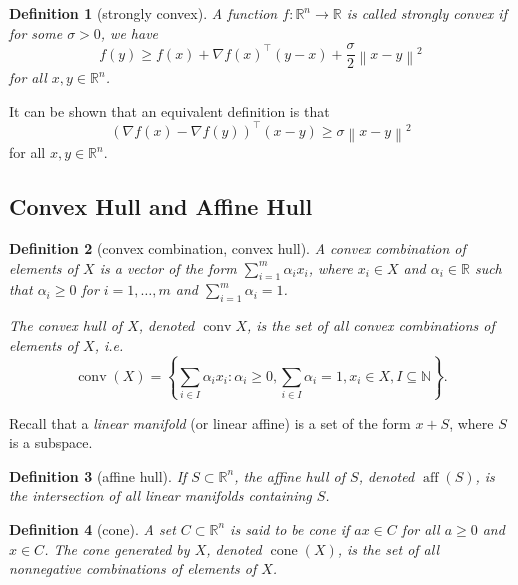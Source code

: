 \documentclass[12pt,a4paper]{article}
\numberwithin{equation}{section}
\theoremstyle{mystyle}
\newtheorem{definition}{Definition}[section]
\newcommand{\R}{\mathbb{R}}
\newcommand{\N}{\mathbb{N}}
\newcommand{\grad}{\nabla}
\newcommand{\T}{\top}
\newcommand{\conv}{\operatorname{conv}}
\newcommand{\cone}{\operatorname{cone}}
\newcommand{\aff}{\operatorname{aff}}
\newcommand{\norm}[1]{\left\lVert #1 \right\rVert}
\begin{document}
	
	\begin{definition}[strongly convex]
		A function $f:\R^n \to \R$ is called \emph{strongly convex} if for some $\sigma>0$, we have
		\begin{equation}
			f(y)\geq f(x)+\grad f(x)^\T (y-x)+\frac{\sigma}{2}\norm{x-y}^2
		\end{equation}
		for all $x,y\in \R^n$.
	\end{definition}
	It can be shown that an equivalent definition is that
	\begin{equation}
		(\grad f(x)-\grad f(y))^\T(x-y)\geq \sigma \norm{x-y}^2
	\end{equation}
	for all $x,y\in \R^n$.
	
	
	\subsection{Convex Hull and Affine Hull}
	\begin{definition}[convex combination, convex hull]
		A \emph{convex combination} of elements of $X$ is a vector of the form $\sum_{i=1}^m \alpha_i x_i$, where $x_i\in X$ and $\alpha_i\in \R$ such that $\alpha_i\geq 0$ for $i=1,\dots,m$ and $\sum_{i=1}^m \alpha_i =1$.
		
		The \emph{convex hull} of $X$, denoted $\conv{X}$, is the set of all convex combinations of elements of $X$, i.e.
		\begin{equation}
			\conv(X) = \left\{\sum_{i\in I} \alpha_i x_i: \alpha_i\geq 0, \sum_{i\in I}\alpha_i=1, x_i\in X, I\subseteq \N \right\}.
		\end{equation} 
	\end{definition}
	
	Recall that a \emph{linear manifold} (or linear affine) is a set of the form $x+S$, where $S$ is a subspace.
	\begin{definition}[affine hull]
		If $S\subset \R^n$, the \emph{affine hull} of $S$, denoted $\aff(S)$, is the intersection of all linear manifolds containing $S$. 
	\end{definition}
	
	\begin{definition}[cone]
		A set $C\subset \R^n$ is said to be \emph{cone} if $ax\in C$ for all $a\geq 0$ and $x\in C$. The \emph{cone generated by $X$}, denoted $\cone(X)$, is the set of all nonnegative combinations of elements of $X$.
	\end{definition}
	
	
	
\end{document}
